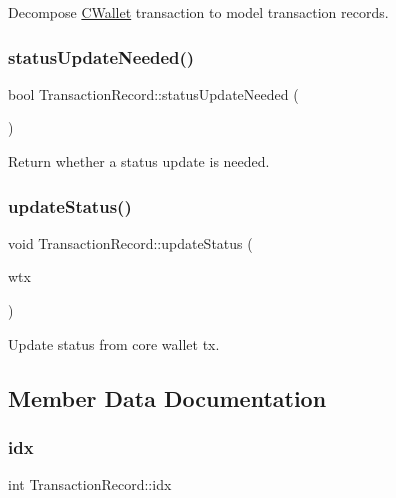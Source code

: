 Decompose \mbox{\hyperlink{class_c_wallet}{C\+Wallet}} transaction to model transaction records. \mbox{\label{class_transaction_record_aaca6757b7b300151694021be6af18d11}} 
\subsubsection{\texorpdfstring{statusUpdateNeeded()}{statusUpdateNeeded()}}
{\footnotesize\ttfamily bool Transaction\+Record\+::status\+Update\+Needed (\begin{DoxyParamCaption}{ }\end{DoxyParamCaption})}

Return whether a status update is needed. \mbox{\label{class_transaction_record_a9b643dd885a790ae511705a1446556be}} 
\subsubsection{\texorpdfstring{updateStatus()}{updateStatus()}}
{\footnotesize\ttfamily void Transaction\+Record\+::update\+Status (\begin{DoxyParamCaption}\item[{const \mbox{\hyperlink{class_c_wallet_tx}{C\+Wallet\+Tx}} \&}]{wtx }\end{DoxyParamCaption})}

Update status from core wallet tx. 

\subsection{Member Data Documentation}
\mbox{\label{class_transaction_record_a143da419e3dc0bc2ec73e22b3a56d1c9}} 
\subsubsection{\texorpdfstring{idx}{idx}}
{\footnotesize\ttfamily int Transaction\+Record\+::idx}


